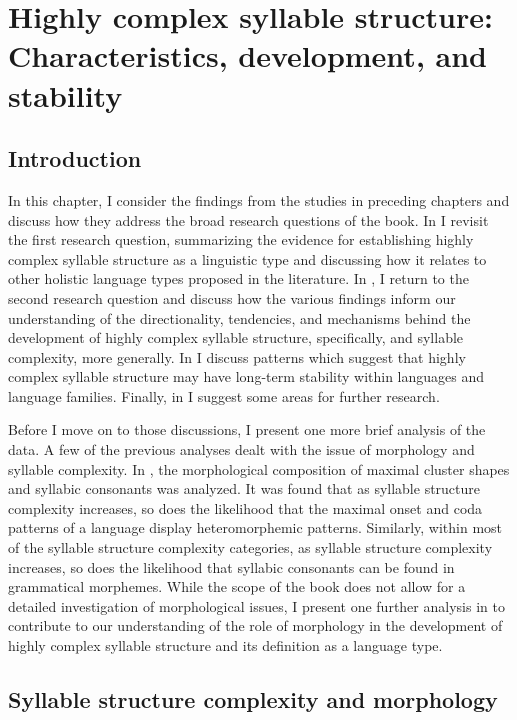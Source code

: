 \chapter{Highly complex syllable structure: Characteristics, development, and stability}\label{sec:8}
\section{Introduction}\label{sec:8.1}

  In this chapter, I consider the findings from the studies in preceding chapters and discuss how they address the broad research questions of the book. In  I revisit the first research question, summarizing the evidence for establishing highly complex syllable structure as a linguistic type and discussing how it relates to other holistic language types proposed in the literature. In , I return to the second research question and discuss how the various findings inform our understanding of the directionality, tendencies, and mechanisms behind the development of highly complex syllable structure, specifically, and syllable complexity, more generally. In  I discuss patterns which suggest that highly complex syllable structure may have long-term stability within languages and language families. Finally, in  I suggest some areas for further research.

  Before I move on to those discussions, I present one more brief analysis of the data. A few of the previous analyses dealt with the issue of morphology and syllable complexity. In  , the morphological composition of maximal cluster shapes and syllabic consonants was analyzed. It was found that as syllable structure complexity increases, so does the likelihood that the maximal onset and coda patterns of a language display heteromorphemic patterns. Similarly, within most of the syllable structure complexity categories, as syllable structure complexity increases, so does the likelihood that syllabic consonants can be found in grammatical morphemes. While the scope of the book does not allow for a detailed investigation of morphological issues, I present one further analysis in  to contribute to our understanding of the role of morphology in the development of highly complex syllable structure and its definition as a language type.

\section{Syllable structure complexity and morphology}\label{sec:8.2}

